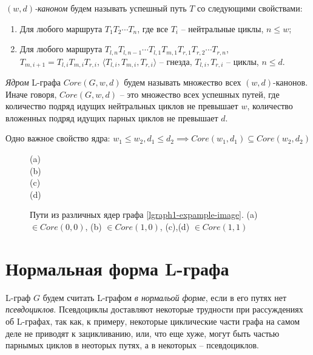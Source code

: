 \emph{$(w,d)$-каноном} будем называть успешный путь $T$ со следующими свойствами:
\begin{enumerate}[label=\arabic*)]
    \item Для любого маршрута $T_1 T_2 \cdots T_n$, где все $T_i$ -- нейтральные циклы, $n \leq w$;
    \item Для любого маршрута $T_{l,n} T_{l,n-1} \cdots T_{l,1} T_{m,1} T_{r,1} T_{r,2} \cdots T_{r,n}$,\\
       $T_{m,i+1} = T_{l,i} T_{m,i} T_{r,i}$, $\langle T_{l,i}, T_{m,i}, T_{r,i} \rangle$ -- гнезда, $T_{l,i}, T_{r,i}$ -- циклы,
       $n \leq d$.
\end{enumerate}

\emph{Ядром} L-графа $Core(G, w, d)$ будем называть множество всех $(w,d)$-канонов. 
Иначе говоря, $Core(G, w, d)$ -- это множество всех успешных путей, 
где количество подряд идущих нейтральных циклов не превышает $w$, 
количество вложенных подряд идущих парных циклов не превышает $d$.  

Одно важное свойство ядра: $w_1 \leq w_2, d_1 \leq d_2 \implies Core(w_1, d_1) \subseteq Core(w_2, d_2)$

\begin{figure}[h]
    \centering
     (a)\\
     (b)\\
     (c)\\
     (d)\\
    
    \caption{Пути из различных ядер графа \ref{lgraph1-expample-image}. (a) $\in Core(0,0)$, (b) $\in Core(1,0)$, (c),(d) $\in Core(1,1)$}
    \label{lgraph1-core-example}
\end{figure}

\section{Нормальная форма L-графа}

L-граф $G$ будем считать L-графом \emph{в нормальой форме}, если в его путях нет \emph{псевдоциклов}.
Псевдоциклы доставляют некоторые трудности при рассуждениях об L-графах, так как, к примеру,
некоторые циклические части графа на самом деле не приводят к зацикливанию, или, что еще хуже, могут
быть частью парнымых циклов в неоторых путях, а в некоторых -- псевдоциклов. 

\clearpage